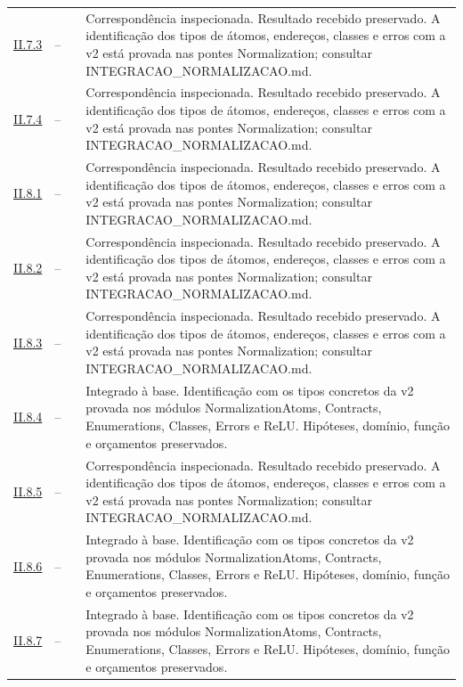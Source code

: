 \begin{longtable}{@{}p{.11\linewidth}p{.09\linewidth}p{.09\linewidth}p{.59\linewidth}@{}}
\hyperref[map:normalizacao:7.3]{II.7.3} & -- & \pageref{map:normalizacao:7.3} & Correspondência inspecionada. Resultado recebido preservado. A identificação dos tipos de átomos, endereços, classes e erros com a v2 está provada nas pontes Normalization; consultar INTEGRACAO\_NORMALIZACAO.md.\\[4pt]
\hyperref[map:normalizacao:7.4]{II.7.4} & -- & \pageref{map:normalizacao:7.4} & Correspondência inspecionada. Resultado recebido preservado. A identificação dos tipos de átomos, endereços, classes e erros com a v2 está provada nas pontes Normalization; consultar INTEGRACAO\_NORMALIZACAO.md.\\[4pt]
\hyperref[map:normalizacao:8.1]{II.8.1} & -- & \pageref{map:normalizacao:8.1} & Correspondência inspecionada. Resultado recebido preservado. A identificação dos tipos de átomos, endereços, classes e erros com a v2 está provada nas pontes Normalization; consultar INTEGRACAO\_NORMALIZACAO.md.\\[4pt]
\hyperref[map:normalizacao:8.2]{II.8.2} & -- & \pageref{map:normalizacao:8.2} & Correspondência inspecionada. Resultado recebido preservado. A identificação dos tipos de átomos, endereços, classes e erros com a v2 está provada nas pontes Normalization; consultar INTEGRACAO\_NORMALIZACAO.md.\\[4pt]
\hyperref[map:normalizacao:8.3]{II.8.3} & -- & \pageref{map:normalizacao:8.3} & Correspondência inspecionada. Resultado recebido preservado. A identificação dos tipos de átomos, endereços, classes e erros com a v2 está provada nas pontes Normalization; consultar INTEGRACAO\_NORMALIZACAO.md.\\[4pt]
\hyperref[map:normalizacao:8.4]{II.8.4} & -- & \pageref{map:normalizacao:8.4} & Integrado à base. Identificação com os tipos concretos da v2 provada nos módulos NormalizationAtoms, Contracts, Enumerations, Classes, Errors e ReLU. Hipóteses, domínio, função e orçamentos preservados.\\[4pt]
\hyperref[map:normalizacao:8.5]{II.8.5} & -- & \pageref{map:normalizacao:8.5} & Correspondência inspecionada. Resultado recebido preservado. A identificação dos tipos de átomos, endereços, classes e erros com a v2 está provada nas pontes Normalization; consultar INTEGRACAO\_NORMALIZACAO.md.\\[4pt]
\hyperref[map:normalizacao:8.6]{II.8.6} & -- & \pageref{map:normalizacao:8.6} & Integrado à base. Identificação com os tipos concretos da v2 provada nos módulos NormalizationAtoms, Contracts, Enumerations, Classes, Errors e ReLU. Hipóteses, domínio, função e orçamentos preservados.\\[4pt]
\hyperref[map:normalizacao:8.7]{II.8.7} & -- & \pageref{map:normalizacao:8.7} & Integrado à base. Identificação com os tipos concretos da v2 provada nos módulos NormalizationAtoms, Contracts, Enumerations, Classes, Errors e ReLU. Hipóteses, domínio, função e orçamentos preservados.\\[4pt]
\bottomrule\end{longtable}\normalsize

